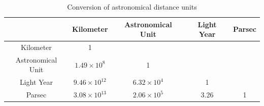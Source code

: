 \begin{table}[h!]
	\centering
	\caption{Conversion of astronomical distance units}
	\begin{tabular}{c | c c c c} 
		 & Kilometer & Astronomical Unit & Light Year & Parsec \\  
		\hline
		Kilometer & 1 &  &  & \\ 
		Astronomical Unit & $1.49\times10^{8}$ & 1 &  & \\
		Light Year & $9.46\times10^{12}$ & $6.32\times10^{4}$ & 1 & \\
		Parsec & $3.08\times10^{13}$ & $2.06\times10^{5}$ & 3.26 & 1 \\
	\end{tabular}
	\label{table:distance}
\end{table}


